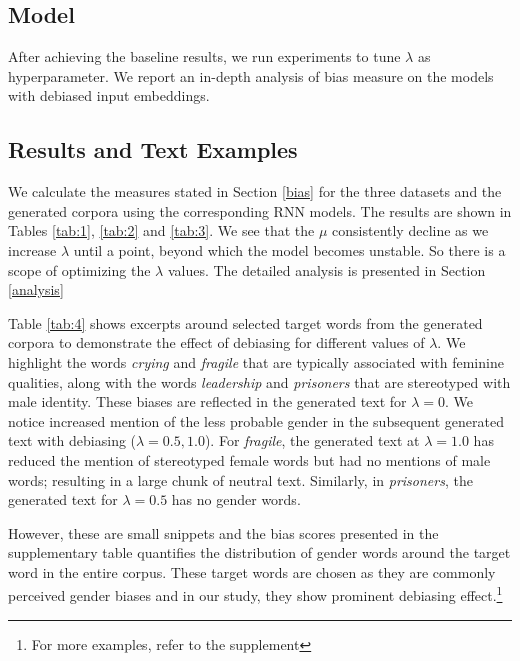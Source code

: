 \documentclass[11pt,a4paper]{article}
\begin{document}
\subsection{Model}
After achieving the baseline results, we run experiments to tune $\lambda$ as hyperparameter.  We report an in-depth analysis of bias measure on the models with debiased input embeddings. 



\subsection{Results and Text Examples}We calculate the measures stated in Section \ref{bias} for the three datasets and the generated corpora using the corresponding RNN models. The results are shown in Tables \ref{tab:1}, \ref{tab:2} and \ref{tab:3}. We see that the $\mu$ consistently decline as we increase $\lambda$ until a point, beyond which the model becomes unstable. So there is a scope of optimizing the $\lambda$ values. The detailed analysis is presented in Section \ref{analysis}

Table \ref{tab:4}  shows excerpts around selected target words from the generated corpora to demonstrate the effect of debiasing for different values of $\lambda$.  We highlight the words \textit{crying} and \textit{fragile} that are typically associated with feminine qualities, along with the words \textit{leadership} and \textit{prisoners} that are stereotyped with male identity. These biases are reflected in the generated text for $\lambda=0$. We notice increased mention of the less probable gender in the subsequent generated text with debiasing ($\lambda=0.5, 1.0$). For \textit{fragile}, the generated text at $\lambda=1.0$ has reduced the mention of stereotyped female words but had no mentions of male words; resulting in a large chunk of neutral text. Similarly, in \textit{prisoners}, the generated text for $\lambda=0.5$ has no gender words. 

However, these are small snippets and the bias scores presented in the supplementary table quantifies the distribution of gender words around the target word in the entire corpus. These target words are chosen as they are commonly perceived gender biases and in our study, they show prominent debiasing effect.\footnote{For more examples, refer to the supplement}

\end{document}
